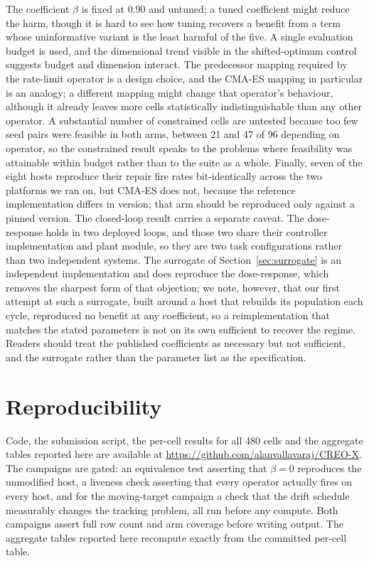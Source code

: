 \documentclass[11pt,a4paper]{article}
\begin{document}
The coefficient $\beta$ is fixed at $0.90$ and untuned; a tuned coefficient might reduce
the harm, though it is hard to see how tuning recovers a benefit from a term whose
uninformative variant is the least harmful of the five. A single evaluation budget is used, and the
dimensional trend visible in the shifted-optimum control suggests budget and dimension
interact. The predecessor mapping required by the rate-limit operator is a design choice,
and the CMA-ES mapping in particular is an analogy; a different mapping might change that
operator's behaviour, although it already leaves more cells statistically
indistinguishable than any other operator. A substantial
number of constrained cells are untested because too few seed pairs were feasible in both
arms, between 21 and 47 of 96 depending on operator, so the constrained result speaks to
the problems where feasibility was attainable within budget rather than to the suite as a
whole. Finally, seven of the eight hosts reproduce their repair fire rates bit-identically
across the two platforms we ran on, but CMA-ES does not, because the reference
implementation differs in version; that arm should be reproduced only against a pinned
version. The closed-loop result carries a separate caveat. The dose-response holds in two
deployed loops, and those two share their controller implementation and plant module, so
they are two task configurations rather than two independent systems. The surrogate of
Section~\ref{sec:surrogate} is an independent implementation and does reproduce the
dose-response, which removes the sharpest form of that objection; we note, however, that our
first attempt at such a surrogate, built around a host that rebuilds its population each
cycle, reproduced no benefit at any coefficient, so a reimplementation that matches the
stated parameters is not on its own sufficient to recover the regime. Readers should treat
the published coefficients as necessary but not sufficient, and the surrogate rather than
the parameter list as the specification.

\section{Reproducibility}

Code, the submission script, the per-cell results for all 480 cells and the aggregate
tables reported here are available at
\url{https://github.com/alanvallavaraj/CREO-X}. The campaigns are gated: an equivalence
test asserting that $\beta=0$ reproduces the unmodified host, a liveness check asserting
that every operator actually fires on every host, and for the moving-target campaign a
check that the drift schedule measurably changes the tracking problem, all run before any
compute.
Both campaigns assert full row count and arm coverage before writing output. The
aggregate tables reported here recompute exactly from the committed per-cell table.
\end{document}
